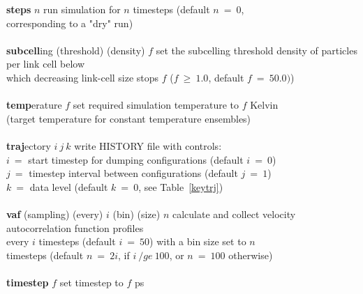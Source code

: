 \begin{tabbing}
\> {\bf steps} $n$                              \> run simulation for $n$ timesteps (default $n~=~0$, \\
\>                                              \> corresponding to a "dry" run) \\
\>                                              \> \\
\> {\bf subcell}ing (threshold) (density) $f$   \> set the subcelling threshold density of particles per link cell below \\
\>                                              \> which decreasing link-cell size stops $f$ ($f~\ge~1.0$, default $f~=~50.0)$) \\
\>                                              \> \\
\> {\bf temp}erature $f$                        \> set required simulation temperature to $f$ Kelvin \\
\>                                              \> (target temperature for constant temperature ensembles) \\
\>                                              \> \\
\> {\bf traj}ectory $i~j~k$                     \> write HISTORY file with controls: \\
\>                                              \> $i~=$ start timestep for dumping configurations (default $i~=~0$) \\
\>                                              \> $j~=$ timestep interval between configurations (default $j~=~1$) \\
\>                                              \> $k~=$ data level (default $k~=~0$, see Table~\ref{keytrj}) \\
\>                                              \> \\
\> {\bf vaf} (sampling) (every) $i$ (bin) (size) $n$ \> \phantom{xxxx} calculate and collect velocity autocorrelation function profiles \\
\>                                                   \> \phantom{xxxx} every $i$ timesteps (default $i~=~50$) with a bin size set to $n$ \\
\>                                                   \> \phantom{xxxx} timesteps (default $n~=~2i$, if $i~/ge~100$, or $n~=~100$ otherwise) \\
\>                                              \> \\
\> {\bf timestep} $f$                           \> set timestep to $f$ ps \\

\end{tabbing}

